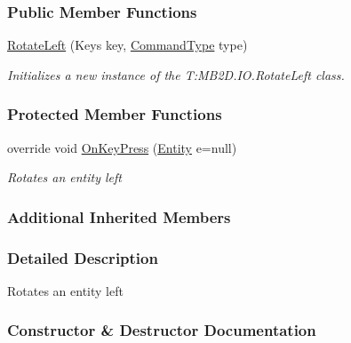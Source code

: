 \subsubsection*{Public Member Functions}
\begin{DoxyCompactItemize}
\item 
\hyperlink{class_m_b2_d_1_1_i_o_1_1_rotate_left_ad37b863a1e1b7256dfe27f61d606156b}{Rotate\+Left} (Keys key, \hyperlink{namespace_m_b2_d_1_1_i_o_ab5f95f3fe9e652778b62bdf943168a68}{Command\+Type} type)
\begin{DoxyCompactList}\small\item\em Initializes a new instance of the T\+:\+M\+B2\+D.\+I\+O.\+Rotate\+Left class. \end{DoxyCompactList}\end{DoxyCompactItemize}
\subsubsection*{Protected Member Functions}
\begin{DoxyCompactItemize}
\item 
override void \hyperlink{class_m_b2_d_1_1_i_o_1_1_rotate_left_adf98596b3689a88aaf1334e00b548443}{On\+Key\+Press} (\hyperlink{class_m_b2_d_1_1_entity_component_1_1_entity}{Entity} e=null)
\begin{DoxyCompactList}\small\item\em Rotates an entity left \end{DoxyCompactList}\end{DoxyCompactItemize}
\subsubsection*{Additional Inherited Members}


\subsubsection{Detailed Description}
Rotates an entity left 



\subsubsection{Constructor \& Destructor Documentation}
\hypertarget{class_m_b2_d_1_1_i_o_1_1_rotate_left_ad37b863a1e1b7256dfe27f61d606156b}{}\label{class_m_b2_d_1_1_i_o_1_1_rotate_left_ad37b863a1e1b7256dfe27f61d606156b} 

